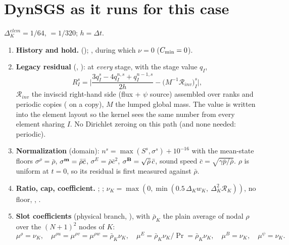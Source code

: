 \documentclass[10pt]{article}
\begin{document}
\section{DynSGS as it runs for this case}
$\Delta^{elem}_K=1/64$,  $=1/320$; $h=\Delta t$.
\begin{enumerate}[leftmargin=*]
\item \textbf{History and hold.}  (); , during
which $\nu=0$ ($C_{\min}=0$).
\item \textbf{Legacy residual} (, ):
at \emph{every} stage, with the stage value $q_I$,
\[
R^s_I=\Big|\frac{3q^s_I-4q^{n,s}_I+q^{n-1,s}_I}{2h}-\big(M^{-1}\mathcal R_{inv}\big)^s_I\Big|,
\]
$\mathcal R_{inv}$ the inviscid right-hand side (flux + $\psi$ source) assembled over ranks and periodic
copies ( on a copy), $M$ the lumped global mass. The value is written into the
element layout so the kernel sees the same number from every element sharing $I$. No Dirichlet zeroing
on this path (and none needed: periodic).
\item \textbf{Normalization} (domain): $n^s=\max(S^s,\sigma^s)+10^{-16}$ with the mean-state floors
$\sigma^\rho=\bar\rho$, $\sigma^{\mathbf{m}}=\bar\rho\bar c$, $\sigma^E=\bar\rho\bar c^2$, $\sigma^{\mathbf{B}}=\sqrt{\bar\rho}\,\bar c$, sound speed
$\bar c=\sqrt{\gamma\bar p/\bar\rho}$. $\rho$ is uniform at $t=0$, so its residual is first measured against $\bar\rho$.
\item \textbf{Ratio, cap, coefficient.} ;
;
$\nu_K=\max(0,\min(0.5\,\Delta_Kw_K,\ \Delta_K^2\mathcal R_K))$, no floor,
, .
\item \textbf{Slot coefficients} (physical branch, ), with $\bar\rho_K$ the plain
average of nodal $\rho$ over the $(N+1)^2$ nodes of $K$:
\[
\mu^\rho=\nu_K,\quad \mu^{\rho u}=\mu^{\rho v}=\mu^{\rho w}=\bar\rho_K\nu_K,\quad
\mu^{E}=\bar\rho_K\nu_K/\Pr=\bar\rho_K\nu_K,\quad \mu^{B}=\nu_K,\quad\mu^\psi=\nu_K .
\]
\end{enumerate}
\end{document}
